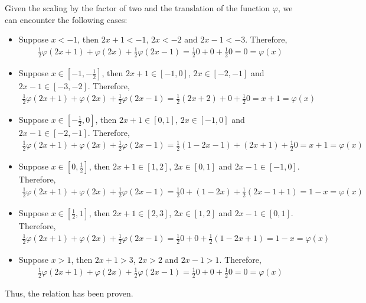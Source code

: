 \begin{questions}
\begin{solution}
Given the scaling by the factor of two and the translation of the function $\varphi$, we can encounter the following cases:
\begin{itemize}
\item Suppose $x<-1$, then $2x+1<-1$, $2x<-2$ and $2x-1<-3$. Therefore,
\begin{align*}
\frac{1}{2}\varphi(2x+1)+\varphi(2x)+\frac{1}{2}\varphi(2x-1)=\frac{1}{2}0+0+\frac{1}{2}0=0=\varphi(x)
\end{align*}
\item Suppose $x\in[-1,-\frac{1}{2}]$, then $2x+1\in[-1,0]$, $2x\in[-2,-1]$ and $2x-1\in[-3,-2]$. Therefore,
\begin{align*}
\frac{1}{2}\varphi(2x+1)+\varphi(2x)+\frac{1}{2}\varphi(2x-1)=\frac{1}{2}(2x+2)+0+\frac{1}{2}0=x+1=\varphi(x)
\end{align*}
\item Suppose $x\in[-\frac{1}{2},0]$, then $2x+1\in[0,1]$, $2x\in[-1,0]$ and $2x-1\in[-2,-1]$. Therefore,
\begin{align*}
\frac{1}{2}\varphi(2x+1)+\varphi(2x)+\frac{1}{2}\varphi(2x-1)=\frac{1}{2}(1-2x-1)+(2x+1)+\frac{1}{2}0=x+1=\varphi(x)
\end{align*}	
\item Suppose $x\in[0,\frac{1}{2}]$, then $2x+1\in[1,2]$, $2x\in[0,1]$ and $2x-1\in[-1,0]$. Therefore,
\begin{align*}
\frac{1}{2}\varphi(2x+1)+\varphi(2x)+\frac{1}{2}\varphi(2x-1)=\frac{1}{2}0+(1-2x)+\frac{1}{2}(2x-1+1)=1-x=\varphi(x)
\end{align*}
\item Suppose $x\in[\frac{1}{2},1]$, then $2x+1\in[2,3]$, $2x\in[1,2]$ and $2x-1\in[0,1]$. Therefore,
\begin{align*}
\frac{1}{2}\varphi(2x+1)+\varphi(2x)+\frac{1}{2}\varphi(2x-1)=\frac{1}{2}0+0+\frac{1}{2}(1-2x+1)=1-x=\varphi(x)
\end{align*}
\item Suppose $x>1$, then $2x+1>3$, $2x>2$ and $2x-1>1$. Therefore,
\begin{align*}
\frac{1}{2}\varphi(2x+1)+\varphi(2x)+\frac{1}{2}\varphi(2x-1)=\frac{1}{2}0+0+\frac{1}{2}0=0=\varphi(x)
\end{align*}
\end{itemize}
Thus, the relation has been proven.
\end{solution}
\end{questions}
